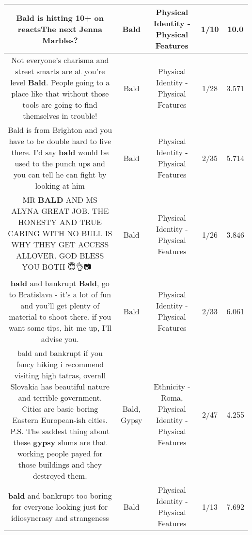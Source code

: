 \documentclass[11pt]{article}
\newlength\mylength
\begin{document}
\begin{center}
\begin{longtable}{|C{.65\mylength}|C{.30\mylength}|C{.12\mylength}|C{.12\mylength}|C{.12\mylength}|}
  \small Bald is hitting 10+ on reactsThe next Jenna Marbles?\normalsize   & Bald & Physical Identity - Physical Features & 1/10 & 10.0 \\  \hline
  \small Not everyone's charisma and street smarts are at you're level \textbf{Bald}. People going to a place like that without those tools are going to find themselves in trouble!\normalsize   & Bald & Physical Identity - Physical Features & 1/28 & 3.571 \\  \hline
  \small Bald is from Brighton and you have to be double hard to live there. I'd say \textbf{bald} would be used to the punch ups and you can tell he can fight by looking at him\normalsize   & Bald & Physical Identity - Physical Features & 2/35 & 5.714 \\  \hline
  \small MR \textbf{BALD} AND MS ALYNA GREAT JOB. THE HONESTY AND TRUE CARING WITH NO BULL IS WHY THEY GET ACCESS ALLOVER. GOD BLESS YOU BOTH 😇👌📷🎥👋🗽\normalsize   & Bald & Physical Identity - Physical Features & 1/26 & 3.846 \\  \hline
  \small \@\textbf{bald} and bankrupt \textbf{Bald}, go to Bratislava - it's a lot of fun and you'll get plenty of material to shoot there. if you want some tips, hit me up, I'll advise you.\normalsize   & Bald & Physical Identity - Physical Features & 2/33 & 6.061 \\  \hline
  \small bald and bankrupt if you fancy hiking i recommend visiting high tatras, overall Slovakia has beautiful nature and terrible government. Cities are basic boring Eastern European-ish cities. P.S. The saddest thing about these \textbf{gypsy} slums are that working people payed for those buildings and they destroyed them.\normalsize   & Bald, Gypsy & Ethnicity - Roma, Physical Identity - Physical Features & 2/47 & 4.255 \\  \hline
  \small \@\textbf{bald} and bankrupt too boring for everyone looking just for idiosyncrasy and strangeness\normalsize   & Bald & Physical Identity - Physical Features & 1/13 & 7.692 \\  \hline

\end{longtable}
\end{center}
\end{document}
